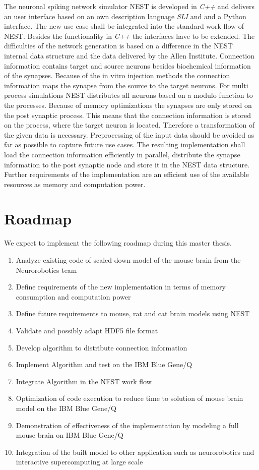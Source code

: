 \documentclass[a4paper]{article}
\begin{document}
The neuronal spiking network simulator NEST is developed in \emph{C++} and delivers
an user interface based on an own description language \emph{SLI} and  and a Python interface.
The new use case shall be integrated into the standard work flow of NEST.
Besides the functionality in \emph{C++} the interfaces have to be extended.
The difficulties of the network generation is based on a difference in 
the NEST internal data structure and the data delivered by the Allen Institute.
Connection information contains target and source neurons besides biochemical
information of the synapses. Because of the in vitro injection methods the
connection information maps the synapse from the source to the target neurons.
For multi process simulations NEST distributes all neurons based on a modulo function 
to the processes. Because of memory optimizations the synapses are only stored on the
post synaptic process. This means that the connection information is stored
on the process, where the target neuron is located. Therefore a transformation of the given data is
necessary. Preprocessing of the input data should be avoided as far as possible to capture
future use cases.
The resulting implementation shall load the connection information efficiently in parallel,
distribute the synapse information to the post synaptic node and store it in
the NEST data structure.
Further requirements of the implementation are an efficient use of the available resources as
memory and computation power. 

\newpage
\section{Roadmap}
We expect to implement the following roadmap during this master thesis.
\begin{enumerate}
    \item Analyze existing code of scaled-down model of the mouse brain from the Neurorobotics team
    \item Define requirements of the new implementation in terms of memory consumption and computation power
    \item Define future requirements to mouse, rat and cat brain models using NEST
    \item Validate and possibly adapt HDF5 file format
    \item Develop algorithm to distribute connection information
    \item Implement Algorithm and test on the IBM Blue Gene/Q
    \item Integrate Algorithm in the NEST work flow
    \item Optimization of code execution to reduce time to solution of mouse brain model on the IBM Blue Gene/Q
    \item Demonstration of effectiveness of the implementation by modeling a full mouse brain on IBM Blue Gene/Q
    \item Integration of the built model to other application such as neurorobotics and interactive supercomputing at large scale
\end{enumerate}
\end{document}
